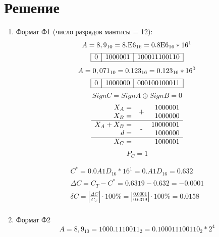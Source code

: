 \documentclass{article}
\begin{document}
\section{Решение}
\begin{enumerate}
       \item Формат Ф1 (число разрядов мантисы = 12):
             $$ A = 8,9_{10} = \textmd{8.E6}_{16} = \textmd{0.8E6}_{16} * 16^1 $$
             $$
                    \begin{array}{|c|c|c|}
                           \hline        
                           0 & 1000001 & 100011100110 \\\hline
                    \end{array}
             $$
             $$ A = 0,071_{10} = \textmd{0.123}_{16} = \textmd{0.123}_{16} * 16^0 $$
             $$
                    \begin{array}{|c|c|c|}
                           \hline        
                           0 & 1000000 & 000100100011 \\\hline
                    \end{array}
             $$
             $$ SignC = SignA \oplus SignB = 0 $$
             $$
                    \begin{array}{rcr}
                           X_A         = & \PLUS  & 1000001         \\
                           X_B         = &        & 1000000 \nl
                           X_A + X_B   = & \MINUS & 10000001        \\
                           d           = &        & 1000000     \nl
                           X_C         = &        & 1000001
                    \end{array}
             $$
             $$ P_C = 1 $$
             
             $$
                    \begin{array}{c}
                           C^* = 0.0A1D_{16} * 16^1 = 0.A1D_{16}  = 0.632\\
                           \Delta C = C_T - C^* = 0.6319 - 0.632 = -0.0001 \\
                           \delta C = \left|\frac{\Delta C}{C_T}\right| \cdot 100\% = \left|\frac{0.0001}{0.6319}\right| \cdot 100\% = 0.0158 \\
                    \end{array}
             $$
       \item Формат Ф2
              $$ A = 8,9_{10} = 1000.1110011_{2} = 0.100011100110_{2} * 2^4 $$
              $$
                     \begin{array}{|c|c|c|}

\end{array}$$
\end{enumerate}
\end{document}
